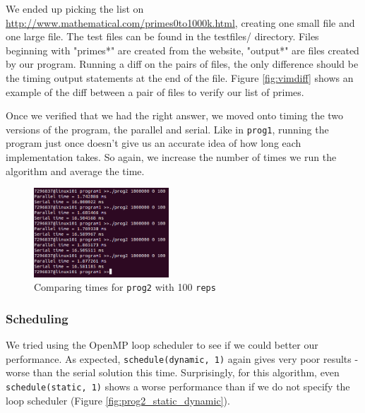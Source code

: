 \documentclass{article}
\begin{document}
\medskip
\noindent
We ended up picking the list on \url{http://www.mathematical.com/primes0to1000k.html}, creating one small file and one large file. The test files can be found in the testfiles/ directory. Files beginning with "primes*" are created from the website, "output*" are files created by our program. Running a diff on the pairs of files, the only difference should be the timing output statements at the end of the file. Figure \ref{fig:vimdiff} shows an example of the diff between a pair of files to verify our list of primes.

\medskip
\noindent
Once we verified that we had the right answer, we moved onto timing the two versions of the program, the parallel and serial. Like in \texttt{prog1}, running the program just once doesn't give us an accurate idea of how long each implementation takes. So again, we increase the number of times we run the algorithm and average the time.

\begin{figure}[ht]
    \centering
    \includegraphics[width=0.45\textwidth]{prog2_timing.png}
    \caption{Comparing times for \texttt{prog2} with 100 \texttt{reps}}
    \label{fig:prog2_timing}
\end{figure}

\subsubsection{Scheduling}
We tried using the OpenMP loop scheduler to see if we could better our performance. As expected, \texttt{schedule(dynamic, 1)} again gives very poor results - worse than the serial solution this time. Surprisingly, for this algorithm, even \texttt{schedule(static, 1)} shows a worse performance than if we do not specify the loop scheduler (Figure \ref{fig:prog2_static_dynamic}). 
\end{document}

